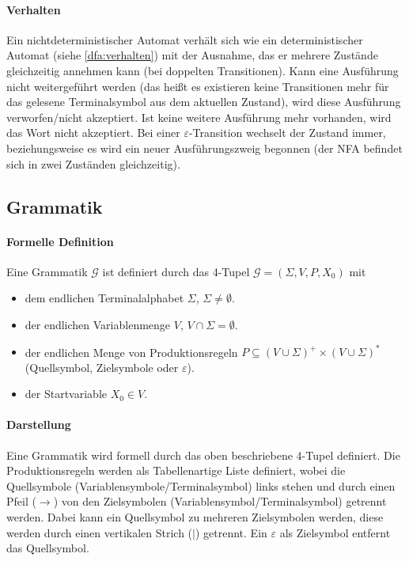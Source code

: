 \paragraph{Verhalten}
Ein nichtdeterministischer Automat verhält sich wie ein deterministischer Automat (siehe \ref{dfa:verhalten}) mit der Ausnahme, das er mehrere Zustände gleichzeitig annehmen kann (bei doppelten Transitionen). Kann eine Ausführung nicht weitergeführt werden (das heißt es existieren keine Transitionen mehr für das gelesene Terminalsymbol aus dem aktuellen Zustand), wird diese Ausführung verworfen/nicht akzeptiert. Ist keine weitere Ausführung mehr vorhanden, wird das Wort nicht akzeptiert. Bei einer $ \varepsilon $-Transition wechselt der Zustand immer, beziehungsweise es wird ein neuer Ausführungszweig begonnen (der NFA befindet sich in zwei Zuständen gleichzeitig).


\subsection{Grammatik}
\paragraph{Formelle Definition}
Eine Grammatik $ \mathcal{G} $ ist definiert durch das 4-Tupel $ \mathcal{G} = (\Sigma, V, P, X _ 0) $ mit
\begin{itemize}
	\item dem endlichen Terminalalphabet $ \Sigma $, $ \Sigma \neq \emptyset $.
	\item der endlichen Variablenmenge $ V $, $ V \cap \Sigma = \emptyset $.
	\item der endlichen Menge von Produktionsregeln $ P \subseteq (V \cup \Sigma) ^ + \times (V \cup \Sigma) ^ * $ (Quellsymbol, Zielsymbole oder $ \varepsilon $).
	\item der Startvariable $ X _ 0 \in V $.
\end{itemize}

\paragraph{Darstellung}
Eine Grammatik wird formell durch das oben beschriebene 4-Tupel definiert. Die Produktionsregeln werden als Tabellenartige Liste definiert, wobei die Quellsymbole (Variablensymbole/Terminalsymbol) links stehen und durch einen Pfeil ($ \rightarrow $) von den Zielsymbolen (Variablensymbol/Terminalsymbol) getrennt werden. Dabei kann ein Quellsymbol zu mehreren Zielsymbolen werden, diese werden durch einen vertikalen Strich ($ | $) getrennt. Ein $ \varepsilon $ als Zielsymbol entfernt das Quellsymbol.

